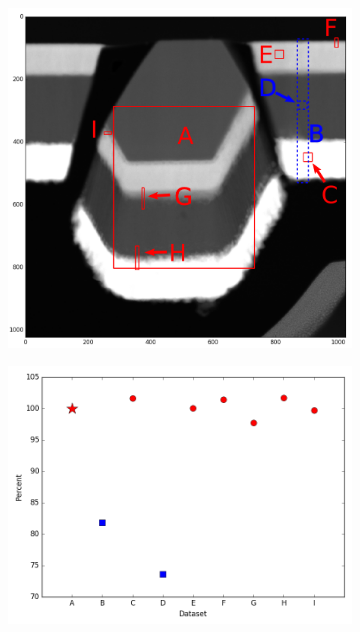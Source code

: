 \begin{figure}
	\begin{subfigure}{.5\textwidth}
		\centering
		\includegraphics[width=\linewidth]{fig/nonheated-images-in-overview (correct)3}
		\caption{}
		\label{fig:nonheated-images-in-overview}
	\end{subfigure}%
	\begin{subfigure}{.5\textwidth}
		\centering
		\includegraphics[width=\linewidth]{fig/nonheated-matching-values}
		\caption{}
		\label{fig:nonheated-matching-values}
	\end{subfigure}
\end{figure}

